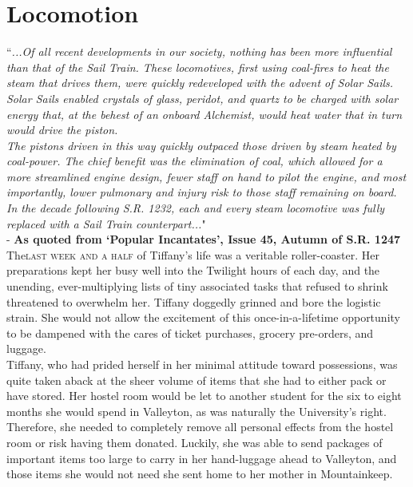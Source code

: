 \chapter{Locomotion}

``\textit{...Of all recent developments in our society, nothing has been more influential than that of the Sail Train. These locomotives, first using coal-fires to heat the steam that drives them, were quickly redeveloped with the advent of Solar Sails.\\
Solar Sails enabled crystals of glass, peridot, and quartz to be charged with solar energy that, at the behest of an onboard Alchemist, would heat water that in turn would drive the piston.\\
The pistons driven in this way quickly outpaced those driven by steam heated by coal-power. The chief benefit was the elimination of coal, which allowed for a more streamlined engine design, fewer staff on hand to pilot the engine, and most importantly, lower pulmonary and injury risk to those staff remaining on board.\\
In the decade following S.R. 1232, each and every steam locomotive was fully replaced with a Sail Train counterpart...}"\\

- \textbf{As quoted from `Popular Incantates', Issue 45, Autumn of S.R. 1247}\\


\lettrine{The}{last week and a half} of Tiffany's life was a veritable roller-coaster.
Her preparations kept her busy well into the Twilight hours of each day, and the unending, ever-multiplying lists of tiny associated tasks that refused to shrink threatened to overwhelm her.
Tiffany doggedly grinned and bore the logistic strain. 
She would not allow the excitement of this once-in-a-lifetime opportunity to be dampened with the cares of ticket purchases, grocery pre-orders, and luggage.\\

Tiffany, who had prided herself in her minimal attitude toward possessions, was quite taken aback at the sheer volume of items that she had to either pack or have stored.
Her hostel room would be let to another student for the six to eight months she would spend in Valleyton, as was naturally the University's right.
Therefore, she needed to completely remove all personal effects from the hostel room or risk having them donated.
Luckily, she was able to send packages of important items too large to carry in her hand-luggage ahead to Valleyton, and those items she would not need she sent home to her mother in Mountainkeep.\\

